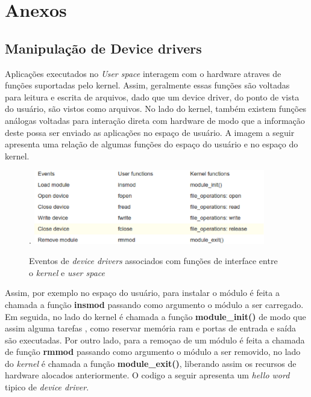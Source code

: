 

\section{Anexos}
\subsection{Manipulação de Device drivers}
Aplicações executados no \textit{User space} interagem com o hardware atraves de funções suportadas
pelo kernel. Assim, geralmente essas funções são voltadas para leitura e escrita de arquivos, dado que um
device driver, do ponto de vista do usuário, são vistos como arquivos. No lado do kernel, também
existem funções análogas voltadas para interação direta com hardware de modo que a informação deste
possa ser enviado as aplicações no espaço de usuário. A imagem a seguir apresenta uma relação de algumas
funções do espaço do usuário e no espaço do kernel.

\begin{figure}[H]
  \centering
  \caption{ Eventos de \textit{device drivers} associados com funções de interface entre o \textit{kernel} e \textit{user space} }.
  \label{fig:usblinux}
  \includegraphics[width=0.9\textwidth]{figure/tabela.eps}
\end{figure}

Assim, por exemplo no espaço do usuário, para instalar o módulo é feita a chamada a função \textbf{insmod} passando
como argumento o módulo a ser carregado. Em seguida, no lado do kernel é chamada a função \textbf{module\_init()} de
modo que assim alguma tarefas , como reservar memória ram e portas de entrada e saída são executadas.
Por outro lado, para a remoçao de um módulo é feita a chamada de função \textbf{rmmod} passando como argumento
o módulo a ser removido, no lado do \textit{kernel} é chamada a função \textbf{module\_exit()}, liberando assim os recursos
de hardware alocados anteriormente. O codigo a seguir apresenta um \textit{hello word} tipico de \textit{device driver}.

